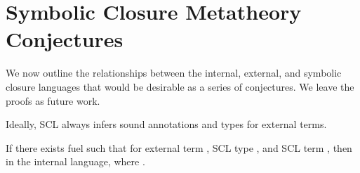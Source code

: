 \chapter{Symbolic Closure Metatheory Conjectures}
\label{chapter:symbolic:metatheory}

We now outline the relationships between the internal, external, and symbolic closure
languages that would be desirable as a series of conjectures.
We leave the proofs as future work.




Ideally, SCL always infers sound annotations and types for external terms.

\begin{conjecture}
  If there exists fuel {\ltiFuel{}} such that
     \ltitSstkjudgement{\ltimakeCombinedThreadedEnv{\ltiFuel{}}{\ltiEmptyClosureCache}}
                       {\ltiEmptyEnv}
                       {\ltiE{}}
                       {\ltiT{}}
                       {\ltimakeCombinedThreadedEnv{\ltiFuelp{}}{\ltiClosureCache{}}}
                       {\ltiEp{}}
  for external term \ltiE{},
                       SCL type \ltiT{},
                       and SCL term \ltiEp{},
                      then
    \ltitjudgementNoElab{}
                  {\ltielimClosLHS{\ltiClosureCache{}}{\ltiEp{}}}
                  {\ltiTp{}}
                   in the internal language,
                  where 
                  \ltiisubtype{}{\ltiTp{}}{\ltielimClosTLHS{\varnothing}{\ltiClosureCache{}}{\ltiT{}}}.
\end{conjecture}

